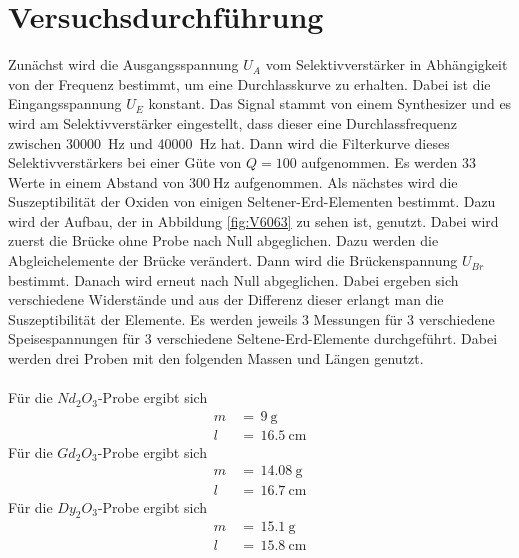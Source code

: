 \documentclass[
  bibliography=totoc,     %
  captions=tableheading,  %
  titlepage=firstiscover, %
]{scrartcl}
\begin{document}
\section{Versuchsdurchführung}
\label{sec:durchführung}
Zunächst wird die Ausgangsspannung $U_A$ vom Selektivverstärker in Abhängigkeit
von der Frequenz bestimmt, um eine Durchlasskurve zu erhalten. Dabei ist die
Eingangsspannung $U_E$ konstant. Das Signal stammt von einem Synthesizer und
es wird am Selektivverstärker eingestellt, dass dieser eine Durchlassfrequenz
zwischen \SI{30000}{\hertz} und \SI{40000}{\hertz} hat. Dann wird die
Filterkurve dieses Selektivverstärkers bei einer Güte von $Q=100$ aufgenommen.
Es werden 33 Werte in einem Abstand von $\SI{300}{\hertz}$ aufgenommen.
Als nächstes wird die Suszeptibilität der Oxiden von einigen
Seltener-Erd-Elementen bestimmt. Dazu wird der Aufbau, der in Abbildung
\ref{fig:V6063} zu sehen ist, genutzt. Dabei wird zuerst die Brücke ohne
Probe nach Null abgeglichen. Dazu werden die Abgleichelemente der Brücke
verändert. Dann wird die Brückenspannung $U_{Br}$ bestimmt. Danach wird
erneut nach Null abgeglichen. Dabei ergeben sich verschiedene Widerstände
und aus der Differenz dieser erlangt man die Suszeptibilität der Elemente.
Es werden jeweils 3 Messungen für 3 verschiedene Speisespannungen für 3
verschiedene Seltene-Erd-Elemente durchgeführt.
\noindent
Dabei werden drei Proben mit den folgenden Massen und Längen genutzt. \\
\\
Für die $Nd_2O_3$-Probe ergibt sich
\begin{align*}
  m\,&=\,\SI{9}{\gram} \\
  l\,&=\,\SI{16.5}{\centi\meter}
\end{align*}
Für die $Gd_2O_3$-Probe ergibt sich
\begin{align*}
  m\,&=\,\SI{14.08}{\gram} \\
  l\,&=\,\SI{16.7}{\centi\meter}
\end{align*}
Für die $Dy_2O_3$-Probe ergibt sich
\begin{align*}
  m\,&=\,\SI{15.1}{\gram} \\
  l\,&=\,\SI{15.8}{\centi\meter}
\end{align*}
\end{document}
